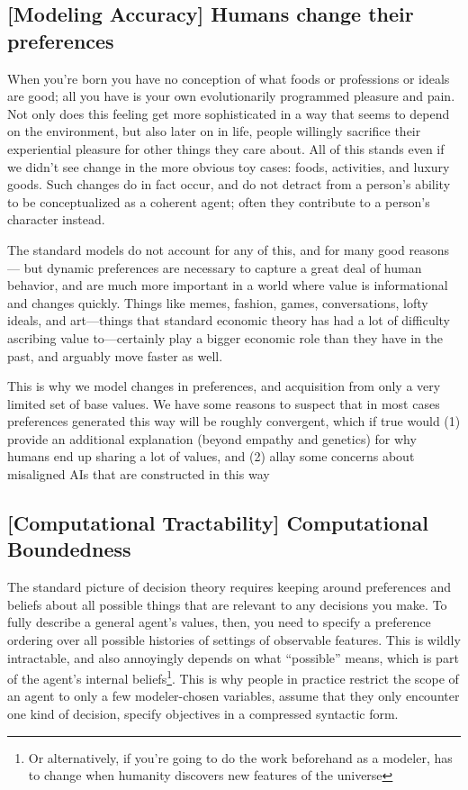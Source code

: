 \documentclass{article}
\begin{document}
	\subsection*{[Modeling Accuracy] Humans change their preferences}
	When you're born you have no conception of what foods or professions or ideals are good; all you have is your own evolutionarily programmed pleasure and pain. Not only does this feeling get more sophisticated in a way that seems to depend on the environment, but also later on in life, people willingly sacrifice their experiential pleasure for other things they care about. All of this stands even if we didn't see change in the more obvious toy cases: foods, activities, and luxury goods. Such changes do in fact occur, and do not detract from a person's ability to be conceptualized as a coherent agent; often they contribute to a person's character instead.
	
	The standard models do not account for any of this, and for many good reasons --- but dynamic preferences are necessary to capture a great deal of human behavior, and are much more important in a world where value is informational and changes quickly. Things like memes, fashion, games, conversations, lofty ideals, and art---things that standard economic theory has had a lot of difficulty ascribing value to---certainly play a bigger economic role than they have in the past, and arguably move faster as well.
	
	{\color{green!30!black}This is why we model changes in preferences, and acquisition from only a very limited set of base values. We have some reasons to suspect that in most cases preferences generated this way will be roughly convergent, which if true would (1) provide an additional explanation (beyond empathy and genetics) for why humans end up sharing a lot of values, and (2) allay some concerns about misaligned AIs that are constructed in this way}
	
	\subsection*{[Computational Tractability] Computational Boundedness}

	The standard picture of decision theory requires keeping around preferences and beliefs about all possible things that are relevant to any decisions you make. To fully describe a general agent's values, then, you need to specify a preference ordering over all possible histories of settings of observable features. This is wildly intractable, and also annoyingly depends on what ``possible'' means, which is part of the agent's internal beliefs\footnote{Or alternatively, if you're going to do the work beforehand as a modeler, has to change when humanity discovers new features of the universe}. This is why people in practice restrict the scope of an agent to only a few modeler-chosen variables, assume that they only encounter one kind of decision, specify objectives in a compressed syntactic form.
	
\end{document}
